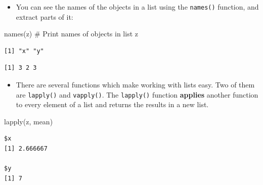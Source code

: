 \documentclass[
  9pt,
  a4paper,
  ignorenonframetext,
  notheorems]{beamer}
\newenvironment{Shaded}{\begin{snugshade}}{\end{snugshade}}
\newcommand{\CommentTok}[1]{\textcolor[rgb]{0.37,0.37,0.37}{#1}}
\newcommand{\FunctionTok}[1]{\textcolor[rgb]{0.28,0.35,0.67}{#1}}
\newcommand{\NormalTok}[1]{\textcolor[rgb]{0.00,0.23,0.31}{#1}}
\newcommand{\SpecialCharTok}[1]{\textcolor[rgb]{0.37,0.37,0.37}{#1}}
\providecommand{\tightlist}{%
  \setlength{\itemsep}{0pt}\setlength{\parskip}{0pt}}\usepackage{longtable,booktabs,array}
\begin{document}
\begin{frame}[fragile]
\begin{itemize}
\tightlist
\item
  You can see the names of the objects in a list using the
  \texttt{names()} function, and extract parts of it:
\end{itemize}

\begin{Shaded}
\begin{Highlighting}[]
\FunctionTok{names}\NormalTok{(z) }\CommentTok{\# Print names of objects in list z}
\end{Highlighting}
\end{Shaded}

\begin{verbatim}
[1] "x" "y"
\end{verbatim}

\begin{Shaded}
\end{Shaded}

\begin{verbatim}
[1] 3 2 3
\end{verbatim}

\begin{itemize}
\tightlist
\item
  There are several functions which make working with lists easy. Two of
  them are \texttt{lapply()} and \texttt{vapply()}. The
  \texttt{lapply()} function \textbf{applies} another function to every
  element of a list and returns the results in a new list.
\end{itemize}

\begin{Shaded}
\begin{Highlighting}[]
\FunctionTok{lapply}\NormalTok{(z, mean)}
\end{Highlighting}
\end{Shaded}

\begin{verbatim}
$x
[1] 2.666667

$y
[1] 7
\end{verbatim}
\end{frame}
\end{document}

